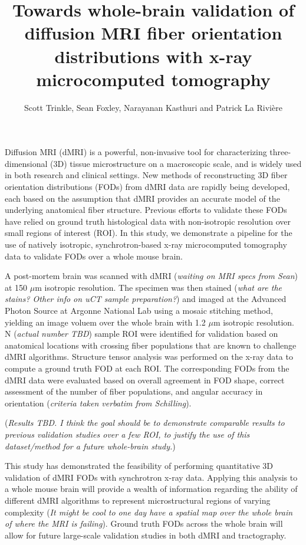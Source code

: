 \documentclass[11pt]{article}
\title{Towards whole-brain validation of diffusion MRI fiber orientation
  distributions with x-ray microcomputed tomography}
\author{Scott Trinkle, Sean
  Foxley, Narayanan Kasthuri and Patrick La Rivi\`ere}
\date{}
\begin{document}
\maketitle

Diffusion MRI (dMRI) is a powerful, non-invasive tool for characterizing
three-dimensional (3D) tissue microstructure on a macroscopic scale, and is
widely used in both research and clinical settings. New methods of
reconstructing 3D fiber orientation distributions (FODs) from dMRI data are
rapidly being developed, each based on the assumption that dMRI provides an
accurate model of the underlying anatomical fiber structure. Previous efforts to
validate these FODs have relied on ground truth histological data with
non-isotropic resolution over small regions of interest (ROI). In this study, we
demonstrate a pipeline for the use of natively isotropic, synchrotron-based x-ray
microcomputed tomography data to validate FODs over a whole mouse brain.

A post-mortem brain was scanned with dMRI (\textit{waiting on MRI specs from
  Sean}) at 150 $\mu\text{m}$ isotropic resolution. The specimen was then
stained (\textit{what are the stains? Other info on uCT sample preparation?})
and imaged at the Advanced Photon Source at Argonne National Lab using a mosaic
stitching method, yielding an image voluem over the whole brain with 1.2 $\mu$m
isotropic resolution. N (\textit{actual number TBD}) sample ROI were identified
for validation based on anatomical locations with crossing fiber populations
that are known to challenge dMRI algorithms. Structure tensor analysis was
performed on the x-ray data to compute a ground truth FOD at each ROI. The
corresponding FODs from the dMRI data were evaluated based on overall agreement
in FOD shape, correct assessment of the number of fiber populations, and angular
accuracy in orientation (\textit{criteria taken verbatim from Schilling}).

(\textit{Results TBD. I think the goal should be to demonstrate comparable
  results to previous validation studies over a few ROI, to justify the use of
  this dataset/method for a future whole-brain study.})

This study has demonstrated the feasibility of performing quantitative 3D
validation of dMRI FODs with synchrotron x-ray data. Applying this analysis to a
whole mouse brain will provide a wealth of information regarding the ability of
different dMRI algorithms to represent microstructural regions of varying
complexity (\textit{It might be cool to one day have a spatial map over the whole
  brain of where the MRI is failing}). Ground truth FODs across the whole brain
will allow for future large-scale validation studies in both dMRI and
tractography.
\end{document}
